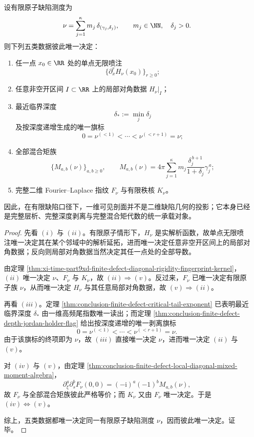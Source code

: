 \begin{theorem}\label{thm:conclusion-finite-defect-jet-depth-flag-moment-fivefold-equivalence}
设有限原子缺陷测度为
\[
\nu=\sum_{j=1}^{\kappa}m_j\,\delta_{(\gamma_j,\delta_j)},
\qquad
m_j\in\NN,
\quad
\delta_j>0.
\]
则下列五类数据彼此唯一决定：
\begin{enumerate}
  \item 任一点 \(x_0\in\RR\) 处的单点无限喷注
  \[
  \bigl\{\partial_x^rH_\nu(x_0)\bigr\}_{r\ge 0};
  \]
  \item 任意非空开区间 \(I\subset\RR\) 上的局部对角数据 \(\left.H_\nu\right|_I\)；
  \item 最近临界深度
  \[
  \delta_*:=\min_j\delta_j
  \]
  及按深度递增生成的唯一旗标
  \[
  0=\nu^{(<1)}<\cdots<\nu^{(<r+1)}=\nu;
  \]
  \item 全部混合矩族
  \[
  \bigl\{M_{a,b}(\nu)\bigr\}_{a,b\ge 0},
  \qquad
  M_{a,b}(\nu)=
  4\pi\sum_{j=1}^{\kappa}
  m_j\frac{\delta_j^{\,b+1}}{1+\delta_j}\gamma_j^{\,a};
  \]
  \item 完整二维 Fourier--Laplace 指纹 \(F_\nu\) 与有限秩核 \(K_\nu\)。
\end{enumerate}
因此，在有限缺陷口径下，一维可见剖面并不是二维缺陷几何的投影；它本身已经是完整层析、完整深度剥离与完整混合矩代数的统一承载对象。
\end{theorem}
\begin{proof}
先看 \((i)\) 与 \((ii)\)。有限原子情形下，\(H_\nu\) 是实解析函数，故单点无限喷注唯一决定其在某个邻域中的解析延拓，进而唯一决定任意非空开区间上的局部对角数据；反向则局部对角数据当然决定其任一点处的全部导数。

由定理 \ref{thm:xi-time-part9xd-finite-defect-diagonal-rigidity-fingerprint-kernel}，\((ii)\) 唯一决定 \(\nu\)、\(F_\nu\) 与 \(K_\nu\)，故 \((ii)\Rightarrow(v)\)。反过来，\(F_\nu\) 已唯一决定有限原子族 \(\nu\)，从而唯一决定 \(H_\nu\) 与其任意局部对角数据，故 \((v)\Rightarrow(ii)\)。

再看 \((iii)\)。定理 \ref{thm:conclusion-finite-defect-critical-tail-exponent} 已表明最近临界深度 \(\delta_*\) 由一维高频尾指数唯一读出；而定理 \ref{thm:conclusion-finite-defect-depth-jordan-holder-flag} 给出按深度递增的唯一剥离旗标
\[
0=\nu^{(<1)}<\cdots<\nu^{(<r+1)}=\nu.
\]
由于该旗标的终项即为 \(\nu\)，故 \((iii)\) 直接唯一决定 \(\nu\)，进而唯一决定 \((ii)\) 与 \((v)\)。

对 \((iv)\) 与 \((v)\)，由定理 \ref{thm:conclusion-finite-defect-local-diagonal-mixed-moment-algebra}，
\[
\partial_\xi^a\partial_s^bF_\nu(0,0)=(-\mathrm{i})^a(-1)^bM_{a,b}(\nu),
\]
故 \(F_\nu\) 与全部混合矩族彼此严格等价；而 \(K_\nu\) 又由 \(F_\nu\) 唯一决定。于是 \((iv)\Leftrightarrow(v)\)。

综上，五类数据都唯一决定同一有限原子缺陷测度 \(\nu\)，因而彼此唯一决定。证毕。
\end{proof}

